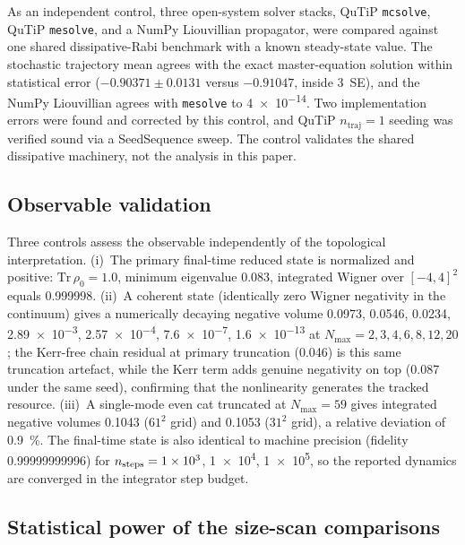 \documentclass[aps,pra,preprint,superscriptaddress,amsmath,amssymb]{revtex4-2}
\begin{document}
As an independent control, three open-system solver stacks, QuTiP \texttt{mcsolve}, QuTiP \texttt{mesolve}, and a NumPy Liouvillian propagator, were compared against one shared dissipative-Rabi benchmark with a known steady-state value. The stochastic trajectory mean agrees with the exact master-equation solution within statistical error ($-0.90371\pm0.0131$ versus $-0.91047$, inside $3$~SE), and the NumPy Liouvillian agrees with \texttt{mesolve} to \num{4e-14}. Two implementation errors were found and corrected by this control, and QuTiP $n_{\text{traj}}=1$ seeding was verified sound via a SeedSequence sweep. The control validates the shared dissipative machinery, not the analysis in this paper.

\subsection{Observable validation}
\label{sec:obsvalidation}

Three controls assess the observable independently of the topological interpretation. (i)~The primary final-time reduced state is normalized and positive: $\mathrm{Tr}\,\rho_0=\num{1.0}$, minimum eigenvalue $\num{+0.083}$, integrated Wigner over $[-4,4]^2$ equals \num{0.999998}. (ii)~A coherent state (identically zero Wigner negativity in the continuum) gives a numerically decaying negative volume \num{0.0973}, \num{0.0546}, \num{0.0234}, \num{2.89e-3}, \num{2.57e-4}, \num{7.6e-7}, \num{1.6e-13} at $N_{\max}=\num{2},\num{3},\num{4},\num{6},\num{8},\num{12},\num{20}$; the Kerr-free chain residual at primary truncation (\num{0.046}) is this same truncation artefact, while the Kerr term adds genuine negativity on top (\num{0.087} under the same seed), confirming that the nonlinearity generates the tracked resource. (iii)~A single-mode even cat truncated at $N_{\max}=\num{59}$ gives integrated negative volumes \num{0.1043} ($\num{61}^2$ grid) and \num{0.1053} ($\num{31}^2$ grid), a relative deviation of \qty{0.9}{\percent}. The final-time state is also identical to machine precision (fidelity \num{0.99999999996}) for $n_{\rm steps}=\num{1e3}$, \num{1e4}, \num{1e5}, so the reported dynamics are converged in the integrator step budget.

\subsection{Statistical power of the size-scan comparisons}
\label{sec:power}
\end{document}
